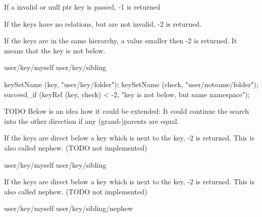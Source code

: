 \begin{DoxyItemize}
\item If a invalid or null ptr key is passed, -\/1 is returned
\end{DoxyItemize}


\begin{DoxyItemize}
\item If the keys have no relations, but are not invalid, -\/2 is returned.
\end{DoxyItemize}


\begin{DoxyItemize}
\item If the keys are in the same hierarchy, a value smaller then -\/2 is returned. It means that the key is not below. \begin{DoxyVerb}
user/key/myself
user/key/sibling
\end{DoxyVerb}

\end{DoxyItemize}


\begin{DoxyCode}
keySetName (key, "user/key/folder");
keySetName (check, "user/notsame/folder");
succeed_if (keyRel (key, check) < -2, "key is not below, but same namespace");
\end{DoxyCode}



\begin{DoxyCode}
\end{DoxyCode}


TODO Below is an idea how it could be extended: It could continue the search into the other direction if any (grand-\/)parents are equal.


\begin{DoxyItemize}
\item If the keys are direct below a key which is next to the key, -\/2 is returned. This is also called nephew. (TODO not implemented) \begin{DoxyVerb}
user/key/myself
user/key/sibling
\end{DoxyVerb}

\end{DoxyItemize}


\begin{DoxyItemize}
\item If the keys are direct below a key which is next to the key, -\/2 is returned. This is also called nephew. (TODO not implemented) \begin{DoxyVerb}
user/key/myself
user/key/sibling/nephew
\end{DoxyVerb}

\end{DoxyItemize}


